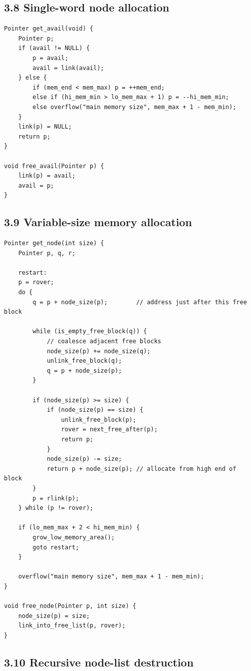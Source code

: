 \documentclass[11pt]{article}
\begin{document}
\subsection{3.8 Single-word node
allocation}\label{single-word-node-allocation}

\begin{verbatim}
Pointer get_avail(void) {
    Pointer p;
    if (avail != NULL) {
        p = avail;
        avail = link(avail);
    } else {
        if (mem_end < mem_max) p = ++mem_end;
        else if (hi_mem_min > lo_mem_max + 1) p = --hi_mem_min;
        else overflow("main memory size", mem_max + 1 - mem_min);
    }
    link(p) = NULL;
    return p;
}

void free_avail(Pointer p) {
    link(p) = avail;
    avail = p;
}
\end{verbatim}

\subsection{3.9 Variable-size memory
allocation}\label{variable-size-memory-allocation}

\begin{verbatim}
Pointer get_node(int size) {
    Pointer p, q, r;

    restart:
    p = rover;
    do {
        q = p + node_size(p);        // address just after this free block

        while (is_empty_free_block(q)) {
            // coalesce adjacent free blocks
            node_size(p) += node_size(q);
            unlink_free_block(q);
            q = p + node_size(p);
        }

        if (node_size(p) >= size) {
            if (node_size(p) == size) {
                unlink_free_block(p);
                rover = next_free_after(p);
                return p;
            }
            node_size(p) -= size;
            return p + node_size(p); // allocate from high end of block
        }
        p = rlink(p);
    } while (p != rover);

    if (lo_mem_max + 2 < hi_mem_min) {
        grow_low_memory_area();
        goto restart;
    }

    overflow("main memory size", mem_max + 1 - mem_min);
}

void free_node(Pointer p, int size) {
    node_size(p) = size;
    link_into_free_list(p, rover);
}
\end{verbatim}

\subsection{3.10 Recursive node-list
destruction}\label{recursive-node-list-destruction}
\end{document}
